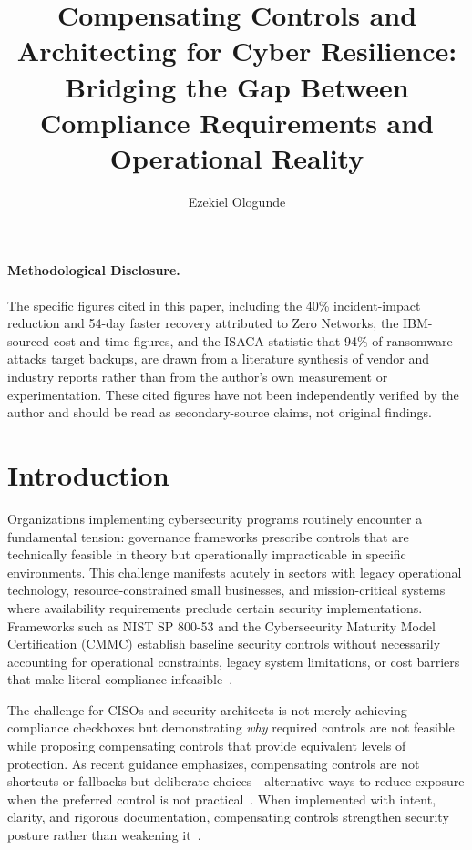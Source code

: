 \documentclass[sigconf,nonacm]{acmart}
\title{Compensating Controls and Architecting for Cyber Resilience:\\
Bridging the Gap Between Compliance Requirements and Operational Reality}
\author{Ezekiel Ologunde}
\affiliation{\institution{Independent Researcher}\city{Boston}\state{MA}\country{USA}}
\begin{document}
\maketitle

\paragraph{Methodological Disclosure.} The specific figures cited in this paper, including the 40\% incident-impact reduction and 54-day faster recovery attributed to Zero Networks, the IBM-sourced cost and time figures, and the ISACA statistic that 94\% of ransomware attacks target backups, are drawn from a literature synthesis of vendor and industry reports rather than from the author's own measurement or experimentation. These cited figures have not been independently verified by the author and should be read as secondary-source claims, not original findings.

\section{Introduction}

Organizations implementing cybersecurity programs routinely encounter a fundamental
tension: governance frameworks prescribe controls that are technically feasible in
theory but operationally impracticable in specific environments. This challenge
manifests acutely in sectors with legacy operational technology, resource-constrained
small businesses, and mission-critical systems where availability requirements preclude
certain security implementations. Frameworks such as NIST SP 800-53 and the
Cybersecurity Maturity Model Certification (CMMC) establish baseline security controls
without necessarily accounting for operational constraints, legacy system limitations,
or cost barriers that make literal compliance
infeasible~\cite{nist2020controls,dod2021cmmc}.

The challenge for CISOs and security architects is not merely achieving compliance
checkboxes but demonstrating \emph{why} required controls are not feasible while
proposing compensating controls that provide equivalent levels of protection. As recent
guidance emphasizes, compensating controls are not shortcuts or fallbacks but deliberate
choices---alternative ways to reduce exposure when the preferred control is not
practical~\cite{reach2024,fortinet2024}. When implemented with intent, clarity, and
rigorous documentation, compensating controls strengthen security posture rather than
weakening it~\cite{metricstream2024}.
\end{document}
